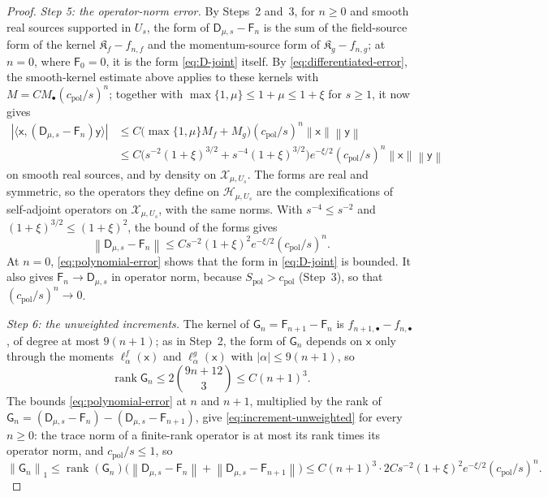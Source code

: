 \documentclass[11pt]{amsart}
\numberwithin{equation}{section}
\theoremstyle{definition}
\newcommand{\Hh}{\mathcal H}
\newcommand{\JointD}{\mathsf D}
\newcommand{\sx}{\mathsf x}
\newcommand{\sy}{\mathsf y}
\newcommand{\rank}{\operatorname{rank}}
\newcommand{\norm}[1]{\left\|#1\right\|}
\newcommand{\ip}[2]{\langle #1,#2\rangle}
\begin{document}
\begin{proof}
\smallskip
\emph{Step 5: the operator-norm error.} By Steps~2 and~3, for
\(n\ge0\) and smooth real sources supported in \(U_s\), the form of
\(\JointD_{\mu,s}-\mathsf F_n\) is the sum of the field-source form of
the kernel \(\mathfrak K_f-f_{n,f}\) and the momentum-source form of
\(\mathfrak K_g-f_{n,g}\); at \(n=0\), where \(\mathsf F_0=0\), it is
the form \eqref{eq:D-joint} itself. By \eqref{eq:differentiated-error},
the smooth-kernel estimate above applies to these kernels with
\(M=CM_\bullet(c_{\mathrm{pol}}/s)^n\); together with
\(\max\{1,\mu\}\le1+\mu\le1+\xi\) for \(s\ge1\), it now gives
\begin{align*}
 |\ip{\sx}{(\JointD_{\mu,s}-\mathsf F_n)\sy}|
 &\le C\bigl(\max\{1,\mu\}M_f+M_g\bigr)
   (c_{\mathrm{pol}}/s)^n\norm{\sx}\norm{\sy}\\
 &\le C\bigl(s^{-2}(1+\xi)^{3/2}+s^{-4}(1+\xi)^{3/2}\bigr)e^{-\xi/2}
   (c_{\mathrm{pol}}/s)^n\norm{\sx}\norm{\sy}
\end{align*}
on smooth real sources, and by density on \(\mathcal X_{\mu,U_s}\).
The forms are real and symmetric, so the operators they define on
\(\Hh_{\mu,U_s}\) are the complexifications of self-adjoint operators
on \(\mathcal X_{\mu,U_s}\), with the same norms. With
\(s^{-4}\le s^{-2}\) and \((1+\xi)^{3/2}\le(1+\xi)^2\), the bound of the
forms gives
\begin{equation}
 \norm{\JointD_{\mu,s}-\mathsf F_n}
 \le Cs^{-2}(1+\xi)^2e^{-\xi/2}(c_{\mathrm{pol}}/s)^n.
 \label{eq:polynomial-error}
\end{equation}
At \(n=0\), \eqref{eq:polynomial-error} shows that the form in
\eqref{eq:D-joint} is bounded. It also gives
\(\mathsf F_n\to\JointD_{\mu,s}\) in operator norm, because
\(S_{\mathrm{pol}}>c_{\mathrm{pol}}\) (Step~3),
so that \((c_{\mathrm{pol}}/s)^n\to0\).

\smallskip
\emph{Step 6: the unweighted increments.} The kernel of
\(\mathsf G_n=\mathsf F_{n+1}-\mathsf F_n\) is
\(f_{n+1,\bullet}-f_{n,\bullet}\), of degree at most \(9(n+1)\); as in
Step~2, the form of \(\mathsf G_n\) depends on \(\sx\) only through the
moments \(\ell^f_\alpha(\sx)\) and \(\ell^g_\alpha(\sx)\) with
\(|\alpha|\le9(n+1)\), so
\[
 \rank\mathsf G_n\le2\binom{9n+12}{3}\le C(n+1)^3 .
\]
The bounds \eqref{eq:polynomial-error} at \(n\) and \(n+1\),
multiplied by the rank of
\(\mathsf G_n=(\JointD_{\mu,s}-\mathsf F_n)-(\JointD_{\mu,s}-\mathsf F_{n+1})\),
give \eqref{eq:increment-unweighted} for every \(n\ge0\): the trace norm
of a finite-rank
operator is at most its rank times its operator norm, and
\(c_{\mathrm{pol}}/s\le1\), so
\[
 \norm{\mathsf G_n}_1
 \le\rank(\mathsf G_n)\bigl(\norm{\JointD_{\mu,s}-\mathsf F_n}
 +\norm{\JointD_{\mu,s}-\mathsf F_{n+1}}\bigr)
 \le C(n+1)^3\cdot2Cs^{-2}(1+\xi)^2e^{-\xi/2}(c_{\mathrm{pol}}/s)^n .
\]


\end{proof}
\end{document}

